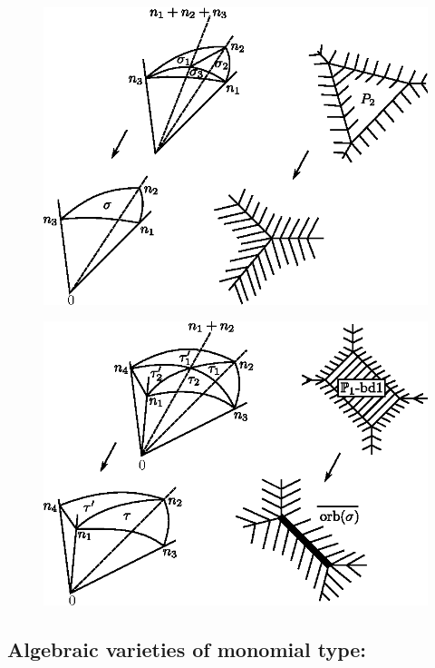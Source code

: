 \begin{coro}
\begin{figure}[H]
\centering 
\includegraphics{vol58-fig/fig58-9.eps} 
\end{figure}
\begin{figure}[H]
\centering 
\includegraphics{vol58-fig/fig58-10.eps} 
\end{figure}

 \end{coro}\pageoriginale

 \subsection{Algebraic varieties of monomial type:}\label{chap1:subsec7.9}
 
